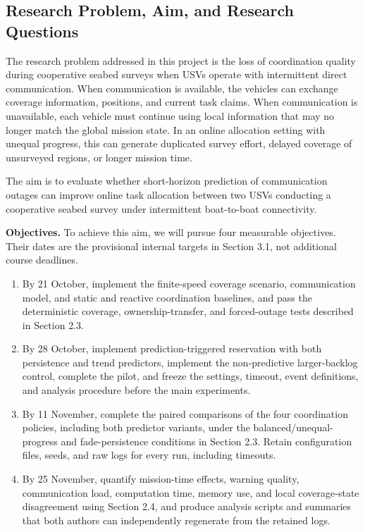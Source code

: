 \subsection{Research Problem, Aim, and Research Questions}

The research problem addressed in this project is the loss of coordination quality during cooperative seabed surveys when USVs operate with intermittent direct communication. When communication is available, the vehicles can exchange coverage information, positions, and current task claims. When communication is unavailable, each vehicle must continue using local information that may no longer match the global mission state. In an online allocation setting with unequal progress, this can generate duplicated survey effort, delayed coverage of unsurveyed regions, or longer mission time.

The aim is to evaluate whether short-horizon prediction of communication outages can improve online task allocation between two USVs conducting a cooperative seabed survey under intermittent boat-to-boat connectivity.

\textbf{Objectives.} To achieve this aim, we will pursue four measurable objectives. Their dates are the provisional internal targets in Section 3.1, not additional course deadlines.
\begin{enumerate}[label=\textbf{O\arabic*.}]
\item By 21 October, implement the finite-speed coverage scenario, communication model, and static and reactive coordination baselines, and pass the deterministic coverage, ownership-transfer, and forced-outage tests described in Section 2.3.
\item By 28 October, implement prediction-triggered reservation with both persistence and trend predictors, implement the non-predictive larger-backlog control, complete the pilot, and freeze the settings, timeout, event definitions, and analysis procedure before the main experiments.
\item By 11 November, complete the paired comparisons of the four coordination policies, including both predictor variants, under the balanced/unequal-progress and fade-persistence conditions in Section 2.3. Retain configuration files, seeds, and raw logs for every run, including timeouts.
\item By 25 November, quantify mission-time effects, warning quality, communication load, computation time, memory use, and local coverage-state disagreement using Section 2.4, and produce analysis scripts and summaries that both authors can independently regenerate from the retained logs.
\end{enumerate}

